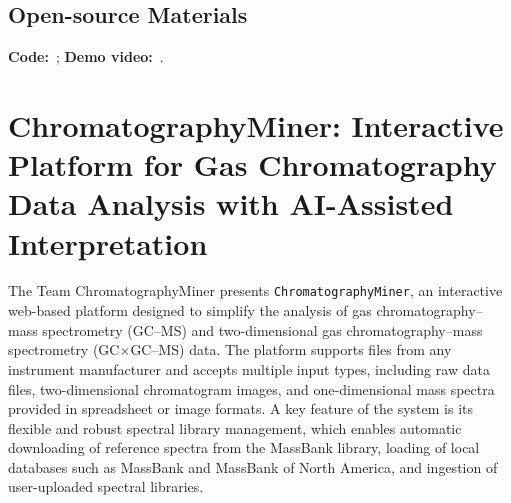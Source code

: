 \subsection*{Open-source Materials}
\textbf{Code:} \,; 
\textbf{Demo video:} \,.








\section{ChromatographyMiner: Interactive Platform for Gas Chromatography Data Analysis with AI-Assisted Interpretation}



The Team ChromatographyMiner presents \texttt{ChromatographyMiner}, an interactive web-based platform designed to simplify the analysis of gas chromatography--mass spectrometry (GC--MS) and two-dimensional gas chromatography--mass spectrometry (GC$\times$GC--MS) data. The platform supports files from any instrument manufacturer and accepts multiple input types, including raw data files, two-dimensional chromatogram images, and one-dimensional mass spectra provided in spreadsheet or image formats. A key feature of the system is its flexible and robust spectral library management, which enables automatic downloading of reference spectra from the MassBank library, loading of local databases such as MassBank and MassBank of North America, and ingestion of user-uploaded spectral libraries.


